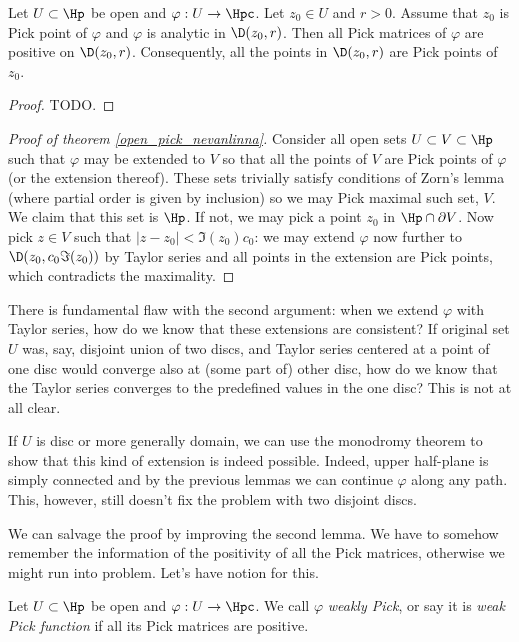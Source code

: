 \begin{lem}
	Let $U \subset \Hp$ be open and $\varphi : U \to \Hpc$. Let $z_{0} \in U$ and $r > 0$. Assume that $z_{0}$ is Pick point of $\varphi$ and $\varphi$ is analytic in $\D(z_{0}, r)$. Then all Pick matrices of $\varphi$ are positive on $\D(z_{0}, r)$. Consequently, all the points in $\D(z_{0}, r)$ are Pick points of $z_{0}$.
\end{lem}
\begin{proof}
	TODO.
\end{proof}

\begin{proof}[Proof of theorem \ref{open_pick_nevanlinna}]
	Consider all open sets $U \subset V \subset \Hp$ such that $\varphi$ may be extended to $V$ so that all the points of $V$ are Pick points of $\varphi$ (or the extension thereof). These sets trivially satisfy conditions of Zorn's lemma (where partial order is given by inclusion) so we may Pick maximal such set, $V$. We claim that this set is $\Hp$. If not, we may pick a point $z_{0}$ in $\Hp \cap \partial V$. Now pick $z \in V$ such that $|z - z_{0}| < \Im(z_{0}) c_{0}$: we may extend $\varphi$ now further to $\D(z_{0}, c_{0} \Im(z_{0}))$ by Taylor series and all points in the extension are Pick points, which contradicts the maximality.
\end{proof}

There is fundamental flaw with the second argument: when we extend $\varphi$ with Taylor series, how do we know that these extensions are consistent? If original set $U$ was, say, disjoint union of two discs, and Taylor series centered at a point of one disc would converge also at (some part of) other disc, how do we know that the Taylor series converges to the predefined values in the one disc? This is not at all clear.

If $U$ is disc or more generally domain, we can use the monodromy theorem to show that this kind of extension is indeed possible. Indeed, upper half-plane is simply connected and by the previous lemmas we can continue $\varphi$ along any path. This, however, still doesn't fix the problem with two disjoint discs.

We can salvage the proof by improving the second lemma. We have to somehow remember the information of the positivity of all the Pick matrices, otherwise we might run into problem. Let's have notion for this.

\begin{maar}
	Let $U \subset \Hp$ be open and $\varphi : U \to \Hpc$. We call $\varphi$ \textit{weakly Pick}, or say it is \textit{weak Pick function} if all its Pick matrices are positive.
\end{maar}

